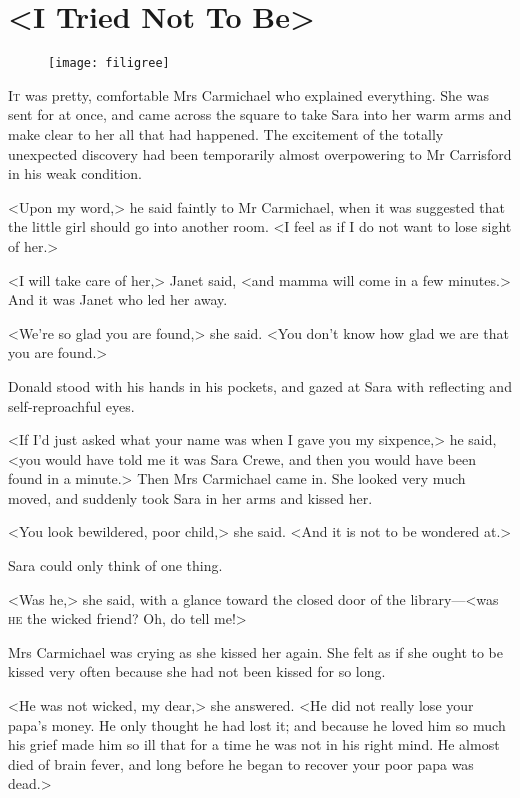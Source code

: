 \chapter{<I Tried Not To Be>}

\begin{figure}[t!]
\centering
\texttt{[image: filigree]}
\end{figure}

\lettrine[lines=5]{I}{t} was pretty, comfortable Mrs Carmichael who explained everything. She was sent for at once, and came across the square to take Sara into her warm arms and make clear to her all that had happened. The excitement of the totally unexpected discovery had been temporarily almost overpowering to Mr Carrisford in his weak condition.

<Upon my word,> he said faintly to Mr Carmichael, when it was suggested that the little girl should go into another room. <I feel as if I do not want to lose sight of her.>

<I will take care of her,> Janet said, <and mamma will come in a few minutes.> And it was Janet who led her away.

<We're so glad you are found,> she said. <You don't know how glad we are that you are found.>

Donald stood with his hands in his pockets, and gazed at Sara with reflecting and self-reproachful eyes.

<If I'd just asked what your name was when I gave you my sixpence,> he said, <you would have told me it was Sara Crewe, and then you would have been found in a minute.> Then Mrs Carmichael came in. She looked very much moved, and suddenly took Sara in her arms and kissed her.

<You look bewildered, poor child,> she said. <And it is not to be wondered at.>

Sara could only think of one thing.

<Was he,> she said, with a glance toward the closed door of the library—<was \textsc{he} the wicked friend? Oh, do tell me!>

Mrs Carmichael was crying as she kissed her again. She felt as if she ought to be kissed very often because she had not been kissed for so long.

<He was not wicked, my dear,> she answered. <He did not really lose your papa's money. He only thought he had lost it; and because he loved him so much his grief made him so ill that for a time he was not in his right mind. He almost died of brain fever, and long before he began to recover your poor papa was dead.>

